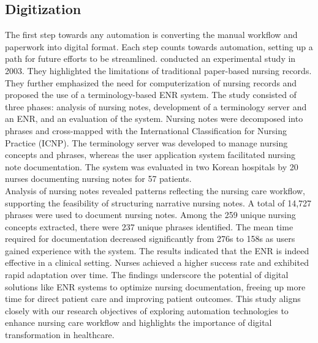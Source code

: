 \subsection{Digitization}
The first step towards any automation is converting the manual workflow and paperwork into digital format. Each step counts towards automation, setting up a path for future efforts to be streamlined. \cite{Study3} conducted an experimental study in 2003. They highlighted the limitations of traditional paper-based nursing records. They further emphasized the need for computerization of nursing records and proposed the use of a terminology-based ENR system. The study consisted of three phases: analysis of nursing notes, development of a terminology server and an ENR, and an evaluation of the system. Nursing notes were decomposed into phrases and cross-mapped with the International Classification for Nursing Practice (ICNP). The terminology server was developed to manage nursing concepts and phrases, whereas the user application system facilitated nursing note documentation. The system was evaluated in two Korean hospitals by 20 nurses documenting nursing notes for 57 patients.\\
Analysis of nursing notes revealed patterns reflecting the nursing care workflow, supporting the feasibility of structuring narrative nursing notes. A total of 14,727 phrases were used to document nursing notes. Among the 259 unique nursing concepts extracted, there were 237 unique phrases identified. The mean time required for documentation decreased significantly from 276s to 158s as users gained experience with the system. The results indicated that the ENR is indeed effective in a clinical setting. Nurses achieved a higher success rate and exhibited rapid adaptation over time. The findings underscore the potential of digital solutions like ENR systems to optimize nursing documentation, freeing up more time for direct patient care and improving patient outcomes. This study aligns closely with our research objectives of exploring automation technologies to enhance nursing care workflow and highlights the importance of digital transformation in healthcare.

